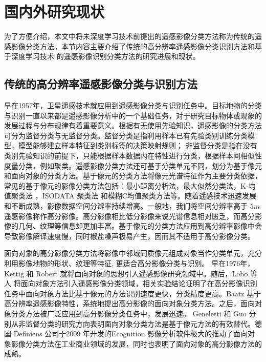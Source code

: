 \section{国内外研究现状}
\label{sec:second}
为了方便介绍，本文中将未深度学习技术前提出的遥感影像分类方法称为传统的遥感影像分类方法。本节内容主要介绍了传统的高分辨率遥感影像分类识别方法和基于深度学习技术\citep{hinton2006fast, bengio2009learning, NIPS2012_4824} 的遥感影像识别分类方法的研究进展和现状。

\subsection{传统的高分辨率遥感影像分类与识别方法}
\label{subsec:1-2-1}
早在1957年，卫星遥感技术就应用到遥感影像分类与识别任务中。目标地物的分类与识别一直以来都是遥感影像分析中的一个基础任务，对于研究目标物体或现象的发展过程与分布规律有着重要意义\cite{jensen1987introductory}。根据有无使用先验知识，遥感影像的分类方法可分为监督分类与无监督分类。监督分类是指利用样本已有先验类别训练分类模型，模型能够建立样本特征到类别标签的决策映射规则； 非监督分类是指在没有类别先验知识的前提下，只能根据样本数据内在特性进行分类，根据样本间相似性度量分类，例如聚类\cite{djukanovic1993unsupervised}。遥感影像分类方法还可基于分类单元不同，划分为基于像元和面向对象的分类方法。基于像元的分类方法将像元光谱特征作为主要分类依据，常见的基于像元的影像分类方法包括：最小距离分析法\cite{wacker1972minimum}，最大似然分类法\cite{strahler1980use}，K-均值聚类法\cite{atkinson2000geostatistical} ，ISODATA 聚类法\cite{paul2002new} 和模糊C均值聚类方法\cite{bezdek1984fcm}等。随着遥感技术迅速发展和不断成熟，影像数据空间分辨率持续增高。一般地，我们将空间分辨率高于 $5m$ 遥感影像称作高分影像\cite{zhangyongsheng2004}。高分影像相比低分影像来说光谱信息相对匮乏，而高分影像的几何、纹理等信息却更加丰富。基于像元的分类方法应用到高分辨率影像中会导致影像解译速度慢，同时椒盐噪声极易产生，因而其不适用于高分影像分类\cite{blaschke2010object}。

面向对象的高分影像分类方法将影像中邻域同质像元组成对象当作分类单元，充分利用影像地物的形状、纹理等特征, 更适合高分影像分类与识别\cite{zhangyongsheng2004}。 早在1976年，Kettig 和 Robert \cite{kettig1976classification} 就将面向对象的思想引入遥感影像研究领域中。随后，Lobo 等人 \cite{lobo1996classification} 将面向对象方法引入遥感影像分类领域，相关实验结论证明了在高分影像识别任务中面向对象方法比基于像元的方法识别速度更快，分类精度更高。Baatz \cite{baatz1999object} 基于高分辨率遥感影像特性，系统地提出高分影像的面向对象分类方法。之后，面向对象分类方法被广泛应用到高分影像分类任务中，发展迅速。 Geneletti \cite{geneletti2003method} 和 Guo \cite{guo2007object} 分别从非监督分类的研究方向表明面向对象分类方法是基于像元方法的有效替代。德国 Definiens 公司于2009 年开发的Ecognition 影像分析软件极大的推动了面向对象影像分类方法在工业商业领域的发展，同时也表明了面向对象的高分影像方法的成熟。

